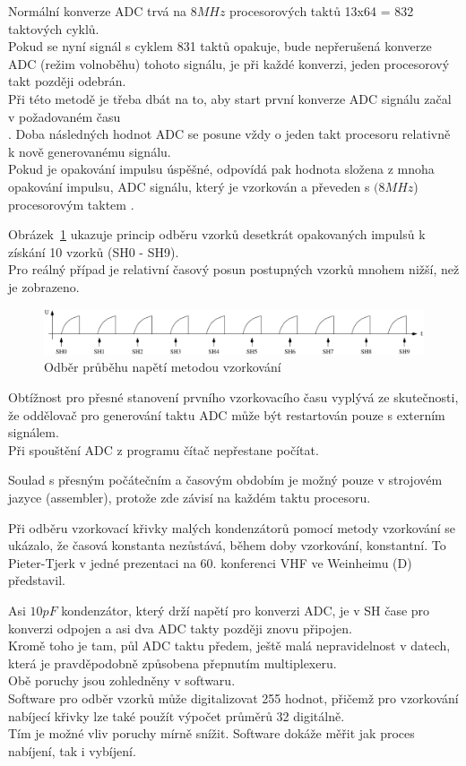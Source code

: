 Normální konverze ADC trvá na \(8MHz\) procesorových taktů 13x64 = 832 taktových cyklů.\\ 
Pokud se nyní signál s cyklem 831 taktů opakuje, bude nepřerušená konverze ADC (režim volnoběhu) tohoto
signálu, je při každé konverzi, jeden procesorový takt později odebrán.\\
Při této metodě je třeba dbát na to, aby start první konverze ADC signálu  začal v požadovaném času\\.
Doba následných hodnot ADC se posune vždy o jeden takt procesoru relativně k nově generovanému signálu.\\
Pokud je opakování impulsu úspěšné, odpovídá pak hodnota složena z mnoha opakování impulsu, ADC signálu,
který je vzorkován a převeden s \((8MHz\)) procesorovým taktem .

Obrázek~\ref{fig:sampling} ukazuje princip odběru vzorků desetkrát opakovaných impulsů k získání 10 vzorků (SH0 - SH9).\\
Pro reálný případ je relativní časový posun postupných vzorků mnohem nižší, než je zobrazeno.

\begin{figure}[H]
\centering
\includegraphics[width=18cm]{../FIG/sampling.pdf}
\caption{Odběr průběhu napětí metodou vzorkování}
\label{fig:sampling}
\end{figure}

Obtížnost pro přesné stanovení prvního vzorkovacího času vyplývá ze skutečnosti, že
oddělovač pro generování taktu ADC může být restartován pouze s externím signálem.\\
Při spouštění ADC z programu  čítač nepřestane počítat.

Soulad s přesným počátečním a časovým obdobím je možný pouze v strojovém jazyce (assembler),
protože zde závisí na každém taktu procesoru.

Při odběru vzorkovací křivky malých kondenzátorů pomocí metody vzorkování se ukázalo,
že časová konstanta nezůstává, během doby vzorkování, konstantní. To Pieter-Tjerk v jedné
prezentaci na 60. konferenci VHF ve Weinheimu (D) představil.

Asi \(10pF\) kondenzátor, který drží napětí pro konverzi ADC, je v SH čase pro konverzi odpojen a asi dva ADC takty později znovu připojen.\\
Kromě toho je tam, půl ADC taktu předem, ještě malá nepravidelnost v datech, která je pravděpodobně
způsobena přepnutím multiplexeru.\\ Obě poruchy jsou zohledněny v softwaru.\\
Software pro odběr vzorků může digitalizovat 255 hodnot, přičemž pro vzorkování nabíjecí křivky lze
také použít výpočet průměrů 32 digitálně.\\ Tím je možné vliv poruchy mírně snížit.
Software dokáže měřit jak proces nabíjení, tak i vybíjení.

